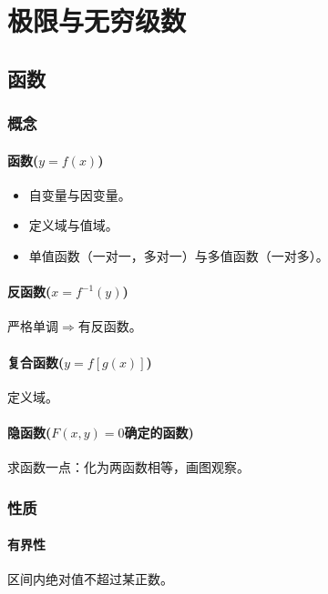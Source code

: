 \documentclass[
12pt, %
a4paper, 
oneside, %
headinclude,footinclude, %
]{scrartcl}
\begin{document}
\section{极限与无穷级数}
\subsection[函数]{函数}
\subsubsection[概念]{概念}
\paragraph{函数($ y = f(x) $)}
\begin{itemize}
\item 自变量与因变量。
\item 定义域与值域。
\item 单值函数（一对一，多对一）与多值函数（一对多）。
\end{itemize}
\paragraph{反函数($ x = f^{-1}(y) $)}
严格单调$ \Rightarrow $有反函数。
\paragraph{复合函数($ y = f[g(x)] $)}
定义域。
\paragraph{隐函数($ F(x,y) = 0 $确定的函数)}
求函数一点：化为两函数相等，画图观察。
\subsubsection[性质]{性质}
\paragraph{有界性}
区间内绝对值不超过某正数。
\end{document}
